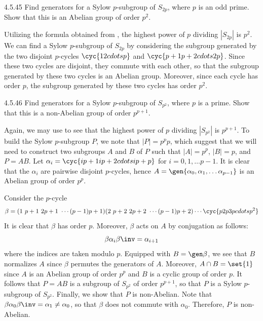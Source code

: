\begin{exercise}{4.5.45}
	Find generators for a Sylow $p$-subgroup of $S_{2p}$, where $p$ is an odd prime.
	Show that this is an Abelian group of order $p^2$.
\end{exercise}

\begin{sol}
	Utilizing the formula obtained from , the highest power of $p$ dividing $|S_{2p}|$ is $p^2$.
	We can find a Sylow $p$-subgroup of $S_{2p}$ by considering the subgroup generated by the two disjoint $p$-cycles $\cyc{1 2 cdots p}$ and $\cyc{p + 1 p + 2 cdots 2p}$.
	Since these two cycles are disjoint, they commute with each other, so that the subgroup generated by these two cycles is an Abelian group.
	Moreover, since each cycle has order $p$, the subgroup generated by these two cycles has order $p^2$.
\end{sol}

\begin{exercise}{4.5.46}
	Find generators for a Sylow $p$-subgroup of $S_{p^2}$, where $p$ is a prime.
	Show that this is a non-Abelian group of order $p^{p + 1}$.
\end{exercise}

\begin{sol}
	Again, we may use  to see that the highest power of $p$ dividing $|S_{p^2}|$ is $p^{p + 1}$.
	To build the Sylow $p$-subgroup $P$, we note that $|P| = p^p p$, which suggest that we will need to construct two subgroups $A$ and $B$ of $P$ such that $|A| = p^p$, $|B| = p$, and $P = AB$.
	Let $\alpha_i = \cyc{ip + 1 ip + 2 cdots ip + p}$ for $i = 0, 1, \ldots p - 1$.
	It is clear that the $\alpha_i$ are pairwise disjoint $p$-cycles, hence $A = \gen{\alpha_0, \alpha_1, \ldots \alpha_{p - 1}}$ is an Abelian group of order $p^p$.

	Consider the $p$-cycle
	\[
		\beta = (1\ p + 1\ 2p + 1\ \cdots (p - 1)p + 1)(2\ p + 2\ 2p + 2\ \cdots (p - 1)p + 2) \cdots \cyc{p 2p 3p cdots p^2}
	\]
	It is clear that $\beta$ has order $p$.
	Moreover, $\beta$ acts on $A$ by conjugation as follows:
	\[
		\beta \alpha_i \beta\inv = \alpha_{i + 1}
	\]
	where the indices are taken modulo $p$.
	Equipped with $B = \gen\beta$, we see that $B$ normalizes $A$ since $\beta$ permutes the generators of $A$.
	Moreover, $A \cap B = \set{1}$ since $A$ is an Abelian group of order $p^p$ and $B$ is a cyclic group of order $p$.
	It follows that $P = AB$ is a subgroup of $S_{p^2}$ of order $p^{p + 1}$, so that $P$ is a Sylow $p$-subgroup of $S_{p^2}$.
	Finally, we show that $P$ is non-Abelian.
	Note that $\beta \alpha_0 \beta\inv = \alpha_1 \neq \alpha_0$, so that $\beta$ does not commute with $\alpha_0$.
	Therefore, $P$ is non-Abelian.
\end{sol}

